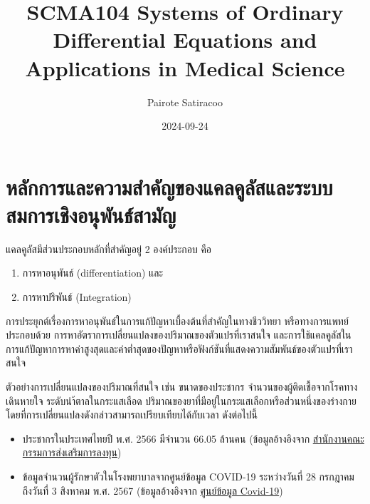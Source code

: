 \documentclass[
]{book}
\title{SCMA104 Systems of Ordinary Differential Equations and Applications in Medical Science}
\author{Pairote Satiracoo}
\date{2024-09-24}
\theoremstyle{definition}
\theoremstyle{definition}
\theoremstyle{definition}
\theoremstyle{definition}
\theoremstyle{remark}
\begin{document}
\maketitle

{
\setcounter{tocdepth}{1}
\tableofcontents
}
\chapter{หลักการและความสำคัญของแคลคูลัสและระบบสมการเชิงอนุพันธ์สามัญ}\label{uxe2buxe25uxe01uxe01uxe32uxe23uxe41uxe25uxe30uxe04uxe27uxe32uxe21uxe2auxe33uxe04uxe0duxe02uxe2duxe07uxe41uxe04uxe25uxe04uxe25uxe2auxe41uxe25uxe30uxe23uxe30uxe1auxe1auxe2auxe21uxe01uxe32uxe23uxe40uxe0auxe07uxe2duxe19uxe1euxe19uxe18uxe2auxe32uxe21uxe0d}

แคลคูลัสมีส่วนประกอบหลักที่สำคัญอยู่ 2 องค์ประกอบ คือ

\begin{enumerate}
\def\labelenumi{\arabic{enumi}.}
\item
  การหาอนุพันธ์ (differentiation) และ
\item
  การหาปริพันธ์ (Integration)
\end{enumerate}

การประยุกต์เรื่องการหาอนุพันธ์ในการแก้ปัญหาเบื้องต้นที่สำคัญในทางชีววิทยา หรือทางการแพทย์ ประกอบด้วย การหาอัตราการเปลี่ยนแปลงของปริมาณของตัวแปรที่เราสนใจ และการใช้แคลคูลัสในการแก้ปัญหาการหาค่าสูงสุดและค่าต่ำสุดของปัญหาหรือฟังก์ชันที่แสดงความสัมพันธ์ของตัวแปรที่เราสนใจ

ตัวอย่างการเปลี่ยนแปลงของปริมาณที่สนใจ เช่น ขนาดของประชากร จำนวนของผู้ติดเชื้อจากโรคทางเดินหายใจ ระดับนำ้ตาลในกระแสเลือด ปริมาณของยาที่มีอยู่ในกระแสเลือกหรือส่วนหนึ่งของร่างกาย โดยที่การเปลี่ยนแปลงดังกล่าวสามารถเปรียบเทียบได้กับเวลา ดังต่อไปนี้

\begin{itemize}
\item
  ประชากรในประเทศไทยปี พ.ศ. 2566 มีจำนวน 66.05 ล้านคน (ข้อมูลอ้างอิงจาก \href{https://www.boi.go.th/index.php?page=demographic}{สำนักงานคณะกรรมการส่งเสริมการลงทุน})
\item
  ข้อมูลจำนวนผู้รักษาตัวในโรงพยาบาลจากศูนย์ข้อมูล COVID-19 ระหว่างวันที่ 28 กรกฎาคม ถึงวันที่ 3 สิงหาคม พ.ศ. 2567 (ข้อมูลอ้างอิงจาก \href{https://www.facebook.com/informationcovid19?locale=th_TH}{ศูนย์ข้อมูล Covid-19})
\end{itemize}
\end{document}
